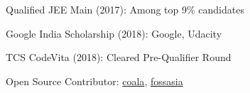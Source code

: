 



\begin{cvhonors}

  \cvhonor
    {Qualified JEE Main (2017): } %
    {Among top 9\% candidates} %
    {} %
    {\bullet} %

  \cvhonor
    {Google India Scholarship (2018): } %
    {Google, Udacity} %
    {} %
    {\bullet} %

  \cvhonor
    {TCS CodeVita (2018): } %
    {Cleared Pre-Qualifier Round} %
    {} %
    {\bullet} %

  \cvhonor
    {Open Source Contributor: } %
    {\href{https://github.com/coala}{coala}, \href{https://github.com/fossasia}{fossasia}} %
    {} %
    {\bullet} %

\end{cvhonors}


